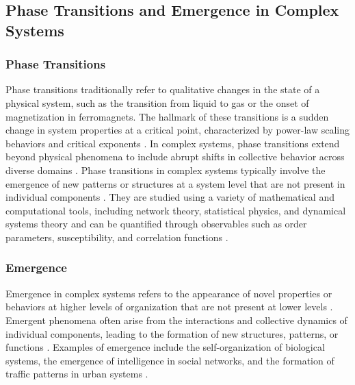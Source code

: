 \subsection{Phase Transitions and Emergence in Complex Systems}

\subsubsection{Phase Transitions}

Phase transitions traditionally refer to qualitative changes in the state of a physical system, such as the transition from liquid to gas or the onset of magnetization in ferromagnets. The hallmark of these transitions is a sudden change in system properties at a critical point, characterized by power-law scaling behaviors and critical exponents \citep{newman2003structure, bak1987self, stanley1971phase}. In complex systems, phase transitions extend beyond physical phenomena to include abrupt shifts in collective behavior across diverse domains \citep{watts2002simple, scheffer2009critical}. Phase transitions in complex systems typically involve the emergence of new patterns or structures at a system level that are not present in individual components \citep{anderson1972more}. They are studied using a variety of mathematical and computational tools, including network theory, statistical physics, and dynamical systems theory \citep{barabasi1999emergence, strogatz2001exploring} and can be quantified through observables such as order parameters, susceptibility, and correlation functions \citep{stanley1999scaling, goldenfeld1992lectures}.

\subsubsection{Emergence}

Emergence in complex systems refers to the appearance of novel properties or behaviors at higher levels of organization that are not present at lower levels \citep{holland1998emergence, anderson1972more}. Emergent phenomena often arise from the interactions and collective dynamics of individual components, leading to the formation of new structures, patterns, or functions \citep{kauffman1993origins, gell1994quark}. Examples of emergence include the self-organization of biological systems, the emergence of intelligence in social networks, and the formation of traffic patterns in urban systems \citep{camazine2003self, haken1983synergetics}.

